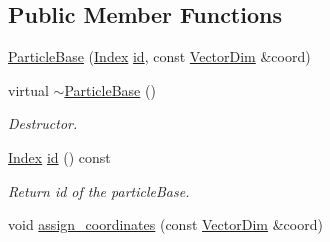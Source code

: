 \subsection*{Public Member Functions}
\begin{DoxyCompactItemize}
\item 
\hyperlink{classmfm_1_1_particle_base_a7e54d8eed2348cf828c643bdd4fe64fe}{Particle\+Base} (\hyperlink{namespacemfm_a7d021c8caa1852f673d78358edc6b7f9}{Index} \hyperlink{classmfm_1_1_particle_base_af0e7293eaedd690be27619c9add4066c}{id}, const \hyperlink{classmfm_1_1_particle_base_afbf037646f60380710274aeddce74480}{Vector\+Dim} \&coord)
\item 
\mbox{\label{classmfm_1_1_particle_base_ac833dd416abf6158b45b54355f8c60f9}} 
virtual \hyperlink{classmfm_1_1_particle_base_ac833dd416abf6158b45b54355f8c60f9}{$\sim$\+Particle\+Base} ()
\begin{DoxyCompactList}\small\item\em Destructor. \end{DoxyCompactList}\item 
\mbox{\label{classmfm_1_1_particle_base_af0e7293eaedd690be27619c9add4066c}} 
\hyperlink{namespacemfm_a7d021c8caa1852f673d78358edc6b7f9}{Index} \hyperlink{classmfm_1_1_particle_base_af0e7293eaedd690be27619c9add4066c}{id} () const
\begin{DoxyCompactList}\small\item\em Return id of the particle\+Base. \end{DoxyCompactList}\item 
void \hyperlink{classmfm_1_1_particle_base_a8ba22c9e8a5f67995013241843a3c0f4}{assign\+\_\+coordinates} (const \hyperlink{classmfm_1_1_particle_base_afbf037646f60380710274aeddce74480}{Vector\+Dim} \&coord)
\end{DoxyCompactItemize}
